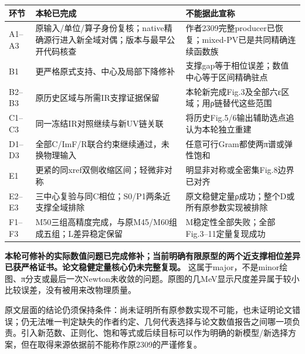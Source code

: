 \documentclass[
  10pt,
  a4paper,
]{article}
\newcounter{none} %
\begin{document}
{\def\LTcaptype{none} %
\begin{longtable}[]{@{}
  >{\raggedright\arraybackslash}p{}
  >{\raggedright\arraybackslash}p{}
  >{\raggedright\arraybackslash}p{}@{}}
\toprule\noalign{}
\begin{minipage}[b]{\linewidth}\raggedright
环节
\end{minipage} & \begin{minipage}[b]{\linewidth}\raggedright
本轮已完成
\end{minipage} & \begin{minipage}[b]{\linewidth}\raggedright
不能据此宣称
\end{minipage} \\
\midrule\noalign{}
\endhead
\bottomrule\noalign{}
\endlastfoot
A1--A3 &
原输入/单位/算子身份复核；native精确源行进入新全域对偶；版本与最早公开代码核查
& 作者2309完整producer已恢复；mixed-PV已是共同精确连续函数族 \\
B1 & 更严格原式支持、中心及局部下降修补 &
支撑gap等于相位误差；数值中心等于区间精确驻点 \\
B2--B3 & 原历史区域与所需IR支撑证据保留 &
本轮新完成Fig.3及全部六ε区域；用ρ链替代这些范围 \\
C1--C3 & 同一冻结IR对照继续与新UV链关联 &
将历史Fig.5/6输出辅助选点追认为本轮独立重建 \\
D1--D3 & 全部C/ImF/R联合约束继续通过，未换物理输入 &
任意可行Gram都使两π谱或弹性饱和 \\
E1 & 更紧的同xref双侧收缩区间；轻微非对称 &
明显非对称或全密集Fig.8边界已对齐 \\
E2--E3 & 三中心复验与同C相位；S0/P1两条近支撑全域排除 &
原文稳健定量ρ成功；整个D或所有原参数实现被排除 \\
F1--F3 & M50三组高精度完成，与原M45/M60组成五组；L差异稳定保留 &
M稳定性全部失败；全部Fig.3--11定量复现成功 \\
\end{longtable}
}

\clearpage

\textbf{本轮可修补的实际数值问题已完成修补；当前明确有限原型的两个近支撑相位差异已获严格证书。论文稳健定量核心仍未完整复现。}
这属于major，不是minor绘图、π分支或最后一次Newton未收敛的问题。原图的几MeV显示尺度差异属于较小比较误差，没有被用来改物理质量。

原文层面的结论仍须保持条件：尚未证明所有原参数实现不可能，也未证明论文错误；仍无法唯一判定缺失的作者约定、几何代表选择与论文数值报告之间哪一项负责。引入新范数、正则化、饱和等式或后续目标可以作为明确的新模型/新选择方案，但在取得来源依据前不能称作原2309的严谨修复。
\end{document}
